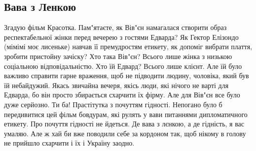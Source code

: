  
 
 
 
 

\subsection{Вава з Ленкою}

Згадую фільм Красотка. Пам"ятаєте, як Вів"єн намагалася створити образ
респектабельної жінки перед вечерею з гостями Едварда? Як Гектор Елізондо
(мімімі моє лисеньке) навчав її премудростям етикету, як допоміг вибрати
плаття, зробити пристойну зачіску? Хто така Вів"єн? Всього лише жінка з низькою
соціальною відповідальністю. Хто їй Едвард? Всього лише клієнт. Але їй було
важливо справити гарне враження, щоб не підводити людину, чоловіка, який був їй
небайдужий. Якась звичайна вечеря, якісь люди, які нічого не варті для Едварда,
бо він просто збирається схарчити їх фірму. Але для Вів"єн все було дуже
серйозно. Ти ба! Прастітутка з почуттям гідності.  Непогано було б передивитися
цей фільм бовдурам, які рулять у вави питаннями дипломатичного етикету. Про
почуття гідності не йдеться. Де вава з лєнкою, а де гідність, я вас умаляю. Але
ж хай би вже поводили себе за кордоном так, щоб нікому в голову не прийшло
схарчити і їх і Україну заодно.
